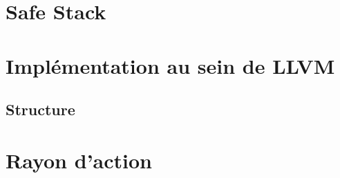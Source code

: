 
\section{Safe Stack}
\label{section:safeStack}


\section{Implémentation au sein de LLVM}

%

\subsection{Structure}


\section{Rayon d'action}

